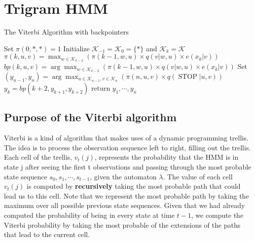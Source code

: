 \section{\textbf{Trigram HMM}}

\begin{algorithm*}[ht]
  \caption{The Viterbi Algorithm with backpointers}
  \label{algo:viterbi}
  Set $\pi(0, *, *)=1$\;
  Initialize $\mathcal{K}_{-1} = \mathcal{K}_0 = \{*\}$ and $\mathcal{K}_{k} = \mathcal{K}$\;
  {
    {
        $\pi(k, u, v)=\max _{w \in \mathcal{K}_{k-2}}\left(\pi(k-1, w, u) \times q(v | w, u) \times e\left(x_{k} | v\right)\right)$\;
        $bp(k, u, v)=\arg \max _{w \in \mathcal{K}_{k-2}}\left(\pi(k-1, w, u) \times q(v | w, u) \times e\left(x_{k} | v\right)\right)$\;
    }
  }
  Set $\left(y_{n-1}, y_{n}\right)=\arg \max _{u \in \mathcal{K}_{n-1}, v \in \mathcal{K}_{n}}(\pi(n, u, v) \times q(\operatorname{STOP} | u, v))$\;
  {
        $y_{k}=bp\left(k+2, y_{k+1}, y_{k+2}\right)$\;
  }
  return $y_1, \cdots, y_n$\;
\end{algorithm*}


\subsection{\textbf{Purpose of the Viterbi algorithm}}

Viterbi is a kind of algorithm that makes uses of a dynamic programming trellis. The idea is to process the observation sequence left to right, filling out the trellis. Each cell of the trellis, $v_t(j)$, represents the probability that the HMM is in state j after seeing the first t observations and passing through the most probable state sequence $s_0,s_1,\cdots,s_{t−1}$, given the automaton $\lambda$. The value of each cell $v_t(j)$ is computed by \textbf{recursively} taking the most probable path that could lead us to this cell. Note that we represent the most probable path by taking the maximum over all possible previous state sequences. Given that we had already computed the probability of being in every state at time $t-1$, we compute the Viterbi probability by taking the most probable of the extensions of the paths that lead to the current cell. 

